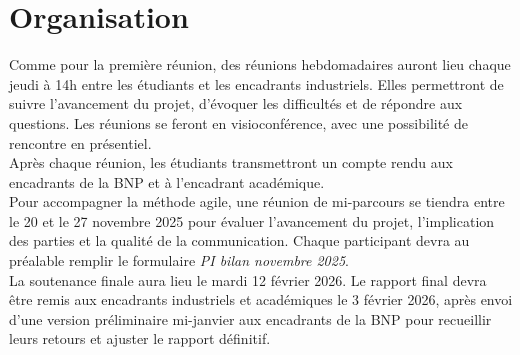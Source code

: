\section{Organisation}


Comme pour la première réunion, des réunions hebdomadaires auront lieu chaque jeudi à 14h entre les étudiants et les
encadrants industriels. Elles permettront de suivre l’avancement du projet, d’évoquer les difficultés et de répondre
aux questions. Les réunions se feront en visioconférence, avec une possibilité de rencontre en présentiel.\\

Après chaque réunion, les étudiants transmettront un compte rendu aux encadrants de la BNP et à l’encadrant académique. \\

Pour accompagner la méthode agile, une réunion de mi-parcours se tiendra entre le 20 et le 27 novembre 2025 pour évaluer l’avancement du projet,
l’implication des parties et la qualité de la communication. Chaque participant devra au préalable remplir le
formulaire \textit{PI bilan novembre 2025}.\\

La soutenance finale aura lieu le mardi 12 février 2026. Le rapport final devra être remis aux encadrants
industriels et académiques le 3 février 2026, après envoi d’une version préliminaire mi-janvier aux encadrants de la
BNP pour recueillir leurs retours et ajuster le rapport définitif.








